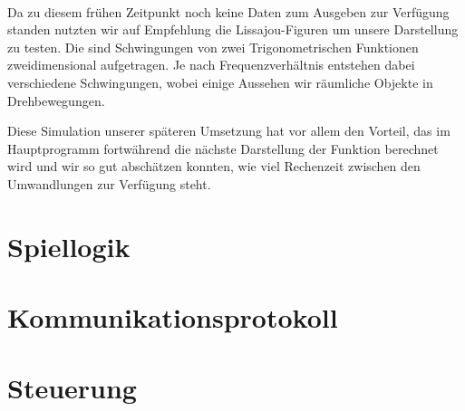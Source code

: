 \paragraph*{}
Da zu diesem frühen Zeitpunkt noch keine Daten zum Ausgeben zur Verfügung standen nutzten wir auf Empfehlung die Lissajou-Figuren um unsere Darstellung zu testen. Die sind Schwingungen von zwei Trigonometrischen Funktionen zweidimensional aufgetragen. Je nach Frequenzverhältnis entstehen dabei verschiedene Schwingungen, wobei einige Aussehen wir räumliche Objekte in Drehbewegungen. 



Diese Simulation unserer späteren Umsetzung hat vor allem den Vorteil, das im Hauptprogramm fortwährend die nächste Darstellung der Funktion berechnet wird und wir so gut abschätzen konnten, wie viel Rechenzeit zwischen den Umwandlungen zur Verfügung steht.

\section*{Spiellogik}

\section*{Kommunikationsprotokoll}

\section*{Steuerung}
